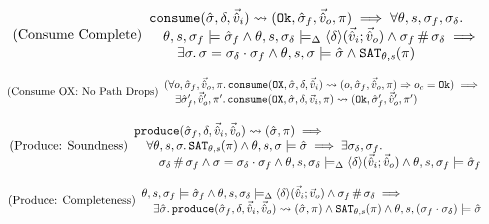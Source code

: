 \begin{equation}
\tag{Consume Complete}\label{eq:consume-complete}
\begin{array}{l}
\texttt{consume}(\hat{\sigma},\delta,\vec{\hat{v}}_i)\rightsquigarrow (\texttt{Ok},\hat{\sigma}_f,\vec{\hat{v}}_o,\pi) \implies \forall \theta,s,\sigma_f,\sigma_\delta\ldotp \\
\quad \theta,s,\sigma_f\models \hat{\sigma}_f \land \theta, s, \sigma_\delta \models_{\Delta} \left<\delta\right>\!(\vec{\hat{v}}_i;\vec{\hat{v}}_o) \land \sigma_f\operatorname{\#}\sigma_\delta \implies \\
\qquad \exists \sigma\ldotp \sigma = \sigma_\delta \cdot \sigma_f \land \theta,s,\sigma\models \hat{\sigma} \land \texttt{SAT}_{\mathit{\theta,s}}(\pi)
\end{array}
\end{equation}

\begin{equation}
\tag{Consume OX: No Path Drops}\label{eq:consume-ox-no-drop}
\begin{array}{l}
(\forall o, \hat{\sigma}_f,\vec{\hat{v}}_o,\pi \ldotp \texttt{consume}(\texttt{OX},\hat{\sigma},\delta,\vec{\hat{v}}_i)\rightsquigarrow (o, \hat{\sigma}_f, \vec{\hat{v}}_o, \pi)\Rightarrow o_c = \texttt{Ok}) \implies \\
\quad \exists  \hat{\sigma}_f',\vec{\hat{v}}_o',\pi' \ldotp \texttt{consume}(\texttt{OX}, \hat{\sigma}, \delta,\vec{v}_i,\pi)\rightsquigarrow (\texttt{Ok}, \hat{\sigma}_f', \vec{\hat{v}}_o', \pi')
\end{array}
\end{equation}

\begin{equation}
\tag{Produce: Soundness}\label{eq:produce-sound}
\begin{array}{l}
\texttt{produce}(\hat{\sigma}_f,\delta,\vec{\hat{v}}_i,\vec{\hat{v}}_o)\rightsquigarrow (\hat{\sigma}, \pi) \implies\\
\quad \forall\theta,s,\sigma\ldotp \texttt{SAT}_{\mathit{\theta,s}}(\pi) \land \theta,s,\sigma\models\hat{\sigma} \implies \exists \sigma_\delta, \sigma_f\ldotp \\
\qquad \sigma_\delta\operatorname{\#}\sigma_f \land \sigma=\sigma_\delta\cdot\sigma_f \land \theta,s,\sigma_\delta \models_{\Delta} \left<\delta\right>\!(\vec{\hat{v}}_i;\vec{\hat{v}}_o) \land \theta,s,\sigma_f \models \hat{\sigma}_f
\end{array}
\end{equation}

\begin{equation}
\tag{Produce: Completeness}\label{eq:produce-complete}
\begin{array}{l}
\theta, s, \sigma_f \models \hat{\sigma}_f \land \theta, s, \sigma_\delta \models_{\Delta} \left<\delta\right>\!(\vec{\hat{v}}_i;\vec{v}_o) \land \sigma_f\operatorname{\#}\sigma_\delta \implies \\
\quad \exists \hat{\sigma}\ldotp \texttt{produce}(\hat{\sigma}_f,\delta,\vec{\hat{v}}_i,\vec{\hat{v}}_o)\rightsquigarrow (\hat{\sigma},\pi) \land \texttt{SAT}_{\mathit{\theta,s}}(\pi) \land \theta,s,(\sigma_f\cdot\sigma_\delta) \models \hat{\sigma}
\end{array}
\end{equation}

